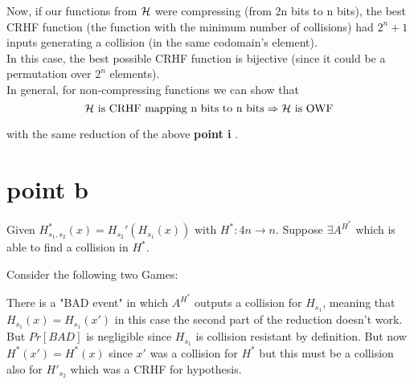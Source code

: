 Now, if our functions from $\mathcal{H}$ were compressing (from 2n bits to n bits), the
best CRHF function (the function with the minimum number of collisions) had
$2^{n} + 1 $ inputs generating a collision (in the same codomain's element).\\

In this case, the best possible CRHF function is bijective (since it could be a permutation over $2^{n}$ elements).\\

In general, for non-compressing functions we can show that 
\[
    \mathcal{H} \text{ is CRHF mapping n bits to n bits}  \Rightarrow \mathcal{H} \text{ is OWF}
\]

with the same reduction of the above \textbf{point i} .

\section{point b}

Given $H_{s_1,s_2}^*(x)=H_{s_2}'(H_{s_1}(x))$ with $H^*:4n \rightarrow n$.
Suppose $\exists A^{H^*}$ which is able to find a collision in $H^*$.

Consider the following two Games:
\begin{figure}[h!]
    \centering
    \sdinit{}
\end{figure}

 There is a "BAD event" in which $A^{H^*}$ outputs a collision for $H_{s_1}$, meaning that $H_{s_1}(x)=H_{s_1}(x')$ in this case the second part of the reduction doesn't work. But $Pr[BAD]$ is negligible since $H_{s_1}$ is collision resistant by definition. But now $H^*(x')=H^*(x)$ since $x'$ was a collision for $H^*$ but this must be a collision also for $H'_{s_2}$ which was a CRHF for hypothesis.